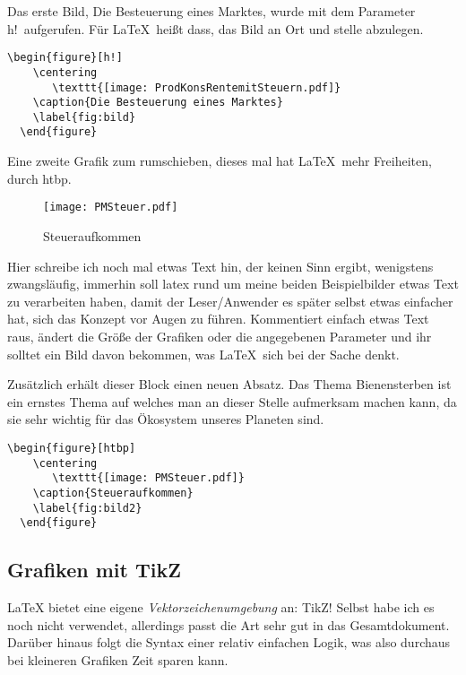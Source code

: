 Das erste Bild, \glqq Die Besteuerung eines Marktes\grqq, wurde mit dem Parameter \glqq h!\grqq\ aufgerufen. Für \LaTeX{}\ heißt dass, das Bild an Ort und stelle abzulegen.%

\begin{lstlisting}[float=htpb,caption=Einbindung einer Grafik so nah wie möglich am Text,label=lst:float_h]
  \begin{figure}[h!]
    \centering
       \texttt{[image: ProdKonsRentemitSteuern.pdf]}
    \caption{Die Besteuerung eines Marktes}
    \label{fig:bild}
  \end{figure}
\end{lstlisting}

Eine zweite Grafik zum rumschieben, dieses mal hat \LaTeX{}\ mehr Freiheiten, durch \glqq htbp\grqq.

\begin{figure}[htbp]
  \centering
     \texttt{[image: PMSteuer.pdf]}
  \caption{Steueraufkommen}
  \label{fig:bild2}
\end{figure}

Hier schreibe ich noch mal etwas Text hin, der keinen Sinn ergibt, wenigstens zwangsläufig, immerhin soll \gls{latex} rund um meine beiden Beispielbilder etwas Text zu verarbeiten haben, damit der Leser/Anwender es später selbst etwas einfacher hat, sich das Konzept vor Augen zu führen. Kommentiert einfach etwas Text raus, ändert die Größe der Grafiken oder die angegebenen Parameter und ihr solltet ein Bild davon bekommen, was \LaTeX{}\ sich bei der Sache denkt.

Zusätzlich erhält dieser Block einen neuen Absatz. Das Thema Bienensterben ist ein ernstes Thema auf welches man an dieser Stelle aufmerksam machen kann, da sie sehr wichtig für das Ökosystem unseres Planeten sind.

\begin{lstlisting}[float=htpb,caption=Automatische Einbindung einer Grafik,label=lst:float_htbp]
  \begin{figure}[htbp]
    \centering
       \texttt{[image: PMSteuer.pdf]}
    \caption{Steueraufkommen}
    \label{fig:bild2}
  \end{figure}
\end{lstlisting}
\subsection{Grafiken mit TikZ}%
\label{sec:tikzgraph}
\LaTeX{} bietet eine eigene \emph{Vektorzeichenumgebung} an: \glqq TikZ\grqq! Selbst habe ich es noch nicht verwendet, allerdings passt die Art sehr gut in das Gesamtdokument. Darüber hinaus folgt die Syntax einer relativ einfachen Logik, was also durchaus bei kleineren Grafiken Zeit sparen kann.

